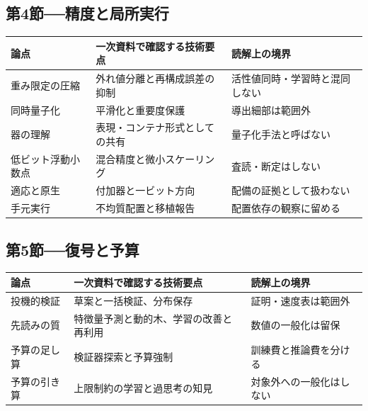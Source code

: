 \documentclass[lualatex,a4paper,10pt]{jlreq}
\begin{document}
\subsection*{第4節──精度と局所実行}
\begin{tabularx}{\textwidth}{@{}>{\raggedright\arraybackslash}p{}>{\raggedright\arraybackslash}p{}>{\raggedright\arraybackslash}X@{}}
\toprule
論点 & 一次資料で確認する技術要点 & 読解上の境界 \\
\midrule
重み限定の圧縮 & 外れ値分離と再構成誤差の抑制 & 活性値同時・学習時と混同しない \\
同時量子化 & 平滑化と重要度保護 & 導出細部は範囲外 \\
器の理解 & 表現・コンテナ形式としての共有 & 量子化手法と呼ばない \\
低ビット浮動小数点 & 混合精度と微小スケーリング & 査読・断定はしない \\
適応と原生 & 付加器と一ビット方向 & 配備の証拠として扱わない \\
手元実行 & 不均質配置と移植報告 & 配置依存の観察に留める \\
\bottomrule
\end{tabularx}
\autocite{llmint8,gptq,qlora,gguf,fp8formats,bitnet}
\normalsize

\subsection*{第5節──復号と予算}
\begin{tabularx}{\textwidth}{@{}>{\raggedright\arraybackslash}p{}>{\raggedright\arraybackslash}p{}>{\raggedright\arraybackslash}X@{}}
\toprule
論点 & 一次資料で確認する技術要点 & 読解上の境界 \\
\midrule
投機的検証 & 草案と一括検証、分布保存 & 証明・速度表は範囲外 \\
先読みの質 & 特徴量予測と動的木、学習の改善と再利用 & 数値の一般化は留保 \\
予算の足し算 & 検証器探索と予算強制 & 訓練費と推論費を分ける \\
予算の引き算 & 上限制約の学習と過思考の知見 & 対象外への一般化はしない \\
\bottomrule
\end{tabularx}
\autocite{specdecode,eagle,mtp,snell2024,thinkprune,overthink}
\normalsize
\end{document}
